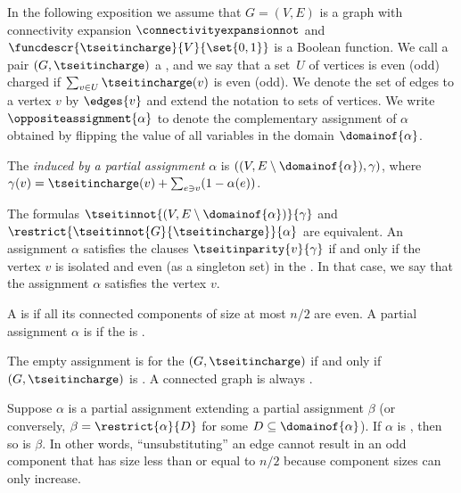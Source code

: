 In the following exposition we assume that $G=(V,E)$ is a graph with connectivity expansion $\connectivityexpansionnot$ and $\funcdescr{\tseitincharge}{V}{\set{0,1}}$ is a Boolean function. We call a pair $(G,\tseitincharge)$ a \introduceterm{\chargedgraph}, and we say that a %
set~$U$ of vertices
is even (odd) charged if $\sum_{v\in U}\tseitincharge(v)$ is even (odd).
We denote the set of edges  to a vertex $v$ by $\edges{v}$ and extend the notation to sets of vertices.
We write
  $\oppositeassignment{\alpha}$
  to denote the complementary assignment
  of $\alpha$
  obtained by flipping the value of all
  variables in the domain
  $\domainof{\alpha}$.

\begin{definition}
  \label{def:induced-graph}
  The \emph{\chargedgraph induced by a partial assignment} $\alpha$ is $((V,E\setminus \domainof{\alpha}),\gamma)$, where $\gamma(v) = \tseitincharge(v) + \sum_{e \ni v}(1 - \alpha(e))$.
\end{definition}

\begin{observation}
  \label{obs:induced-graph-and-assignments}
  The formulas $\tseitinnot{(V,E\setminus \domainof{\alpha})}{\gamma}$ and $\restrict{\tseitinnot{G}{\tseitincharge}}{\alpha}$ are equivalent. An assignment $\alpha$ satisfies the clauses $\tseitinparity{v}{\gamma}$ if and only if the vertex $v$ is isolated and even (as a singleton set) in the \inducedgraph{$\alpha$}. In that case, we say that the assignment $\alpha$ satisfies the vertex $v$.
\end{observation}

\begin{definition}[\nonsplittingassignment]
  \label{def:non-splitting-assignment} A \chargedgraph is \introduceterm{\Gnonsplittingnot} if all its connected components of size at most $n/2$ are even. A partial assignment $\alpha$ is \emph{\nonsplitting} if the \inducedgraph{$\alpha$} is \Gnonsplitting.
\end{definition}

\begin{observation}
 \label{obs:empty-assignment}
 The empty assignment is \nonsplitting for the \chargedgraph
 $(G,\tseitincharge)$ if and only if $(G,\tseitincharge)$ is \Gnonsplittingnot. A connected graph is always \Gnonsplittingnot.
\end{observation}

\begin{observation}
 \label{obs:restriction-non-splitting}
 Suppose $\alpha$ is a partial assignment extending a partial assignment $\beta$ (or conversely, $\beta = \restrict{\alpha}{D}$ for some $D \subseteq \domainof{\alpha}$). If $\alpha$ is \nonsplitting, then so is $\beta$. In other words, ``unsubstituting'' an edge cannot result in an odd component that has size less than or equal to $n/2$ because component sizes can only increase.
\end{observation}


